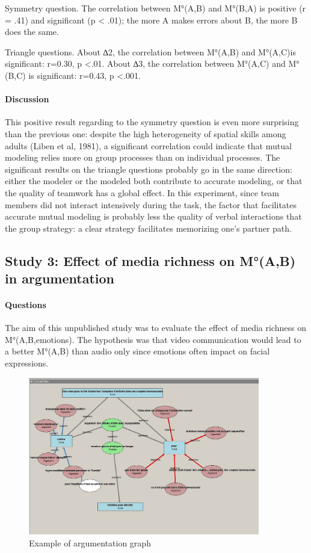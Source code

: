 \documentclass[twocolumn]{article}
\begin{document}
Symmetry question. The correlation between M°(A,B)  and M°(B,A)  is positive (r
= .41) and significant (p < .01);  the more A makes errors about B, the more B
does the same.

Triangle questions. About ∆2, the correlation between M°(A,B) and M°(A,C)is
significant: r=0.30, p <.01. About ∆3, the correlation between M°(A,C) and
M°(B,C) is significant: r=0.43, p <.001. 

\paragraph{Discussion}

This positive result regarding to the symmetry question is even more surprising
than the previous one: despite the high heterogeneity of spatial skills among
adults (Liben et al, 1981), a significant correlation could indicate that mutual
modeling relies more on group processes than on individual processes. The
significant results on the triangle questions probably go in the same direction:
either the modeler or the modeled both contribute to accurate modeling, or that
the quality of teamwork has a global effect. In this experiment, since team
members did not interact intensively during the task, the factor that
facilitates accurate mutual modeling is probably less the quality of verbal
interactions that the group strategy: a clear strategy facilitates memorizing
one’s partner path. 

\subsection{Study 3:  Effect of media richness on M°(A,B) in argumentation}

\paragraph{Questions}

The aim of this unpublished study was to evaluate the effect of media richness
on M°(A,B,emotions). The hypothesis was that video communication would lead to a
better M°(A,B) than audio only since emotions often impact on facial
expressions.

\begin{figure}[ht!]
        \centering
        \includegraphics[width=0.9\textwidth]{image8.jpg}
        \caption{Example of argumentation graph}
        \label{study3:argumentation_graph}
\end{figure}
\end{document}
